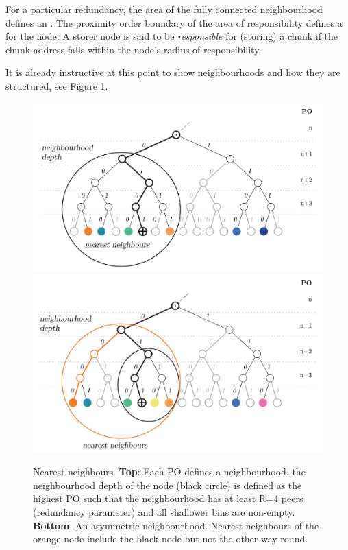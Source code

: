 For a particular redundancy, the area of the fully connected neighbourhood defines an . The proximity order boundary of the area of responsibility defines a  for the node. A storer node is said to be \emph{responsible} for (storing) a chunk if the chunk address falls within the node's radius of responsibility.

It is already instructive at this point to show neighbourhoods and how they are structured, see Figure \ref{fig:nearest-neighbours}. 

\begin{figure}[htbp]
   \centering
   \includegraphics[width=\textwidth]{fig/nearest-neighbours-2.pdf}\\
   \includegraphics[width=\textwidth]{fig/asymmetric-nodes2.pdf}
   \caption[Nearest neighbours \statusgreen]{Nearest neighbours. \textbf{Top}: Each PO defines a neighbourhood, the neighbourhood depth of the node (black circle) is defined as the highest PO such that the neighbourhood has at least R=4 peers (redundancy parameter) and all shallower bins are non-empty. \textbf{Bottom}: An asymmetric neighbourhood. Nearest neighbours of the orange node include the black node but not the other way round.}
   \label{fig:nearest-neighbours}
\end{figure}


